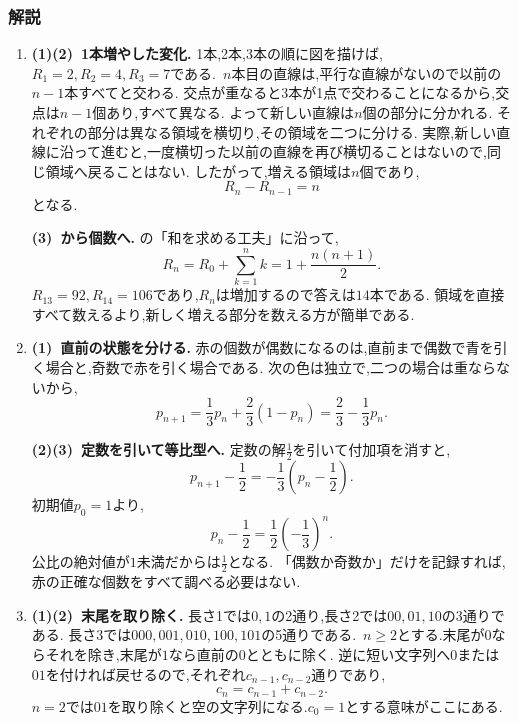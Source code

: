 \subsubsection{解説}\label{節：発展入門：解説}
\begin{enumerate}[label=\textbf{問\arabic*.},leftmargin=3.8em,format=\bookitemlink{practice-bridge}{solution}{problem}]
  \item \textbf{(1)(2)~1本増やした変化.}
    1本,2本,3本の順に図を描けば,$R_1=2,R_2=4,R_3=7$である.\,
    $n$本目の直線は,平行な直線がないので以前の$n-1$本すべてと交わる.
    交点が重なると3本が1点で交わることになるから,交点は$n-1$個あり,すべて異なる.
    よって新しい直線は$n$個の部分に分かれる.
    それぞれの部分は異なる領域を横切り,その領域を二つに分ける.
    実際,新しい直線に沿って進むと,一度横切った以前の直線を再び横切ることはないので,同じ領域へ戻ることはない.
    したがって,増える領域は$n$個であり,
    \[
      R_n-R_{n-1}=n
    \]
    となる.

    \smallskip
    \textbf{(3)~から個数へ.}
    の「和を求める工夫」に沿って,
    \[
      R_n=R_0+\sum_{k=1}^{n}k
      =1+\frac{n(n+1)}2.
    \]
    $R_{13}=92,R_{14}=106$であり,$R_n$は増加するので答えは$14$本である.
    領域を直接すべて数えるより,新しく増える部分を数える方が簡単である.
  \item \textbf{(1)~直前の状態を分ける.}
    赤の個数が偶数になるのは,直前まで偶数で青を引く場合と,奇数で赤を引く場合である.
    次の色は独立で,二つの場合は重ならないから,
    \[
      p_{n+1}=\frac13p_n+\frac23(1-p_n)
      =\frac23-\frac13p_n.
    \]

    \smallskip
    \textbf{(2)(3)~定数を引いて等比型へ.}
    定数の解$\frac12$を引いて付加項を消すと,
    \[
      p_{n+1}-\frac12
      =-\frac13\left(p_n-\frac12\right).
    \]
    初期値$p_0=1$より,
    \[
      p_n-\frac12=\frac12\left(-\frac13\right)^n.
    \]
    公比の絶対値が$1$未満だからは$\frac12$となる.
    「偶数か奇数か」だけを記録すれば,赤の正確な個数をすべて調べる必要はない.
  \item \textbf{(1)(2)~末尾を取り除く.}
    長さ1では$0,1$の2通り,長さ2では$00,01,10$の3通りである.
    長さ3では\BookMathLayout{}{\newline}$000,001,010,100,101$の5通りである.\,
    $n\ge2$とする.末尾が$0$ならそれを除き,末尾が$1$なら直前の$0$とともに除く.
    逆に短い文字列へ$0$または$01$を付ければ戻せるので,それぞれ$c_{n-1},c_{n-2}$通りであり,
    \[
      c_n=c_{n-1}+c_{n-2}.
    \]
    $n=2$では$01$を取り除くと空の文字列になる.$c_0=1$とする意味がここにある.


\end{enumerate}
